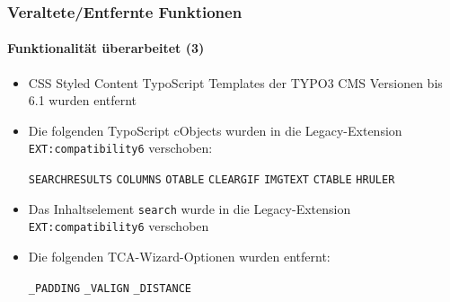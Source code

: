 \begin{frame}[fragile]
	\frametitle{Veraltete/Entfernte Funktionen}
	\framesubtitle{Funktionalität überarbeitet (3)}

	\begin{itemize}
		\item CSS Styled Content TypoScript Templates der TYPO3 CMS Versionen bis 6.1 wurden entfernt

		\item Die folgenden TypoScript cObjects wurden in die Legacy-Extension
			\texttt{EXT:compatibility6} verschoben:

			\vspace{0.2cm}

			\small
				\texttt{SEARCHRESULTS} \tabto{3cm}\texttt{COLUMNS} \tabto{6cm}\texttt{OTABLE} \tabto{9cm}\texttt{CLEARGIF}\newline
				\texttt{IMGTEXT}       \tabto{3cm}\texttt{CTABLE}  \tabto{6cm}\texttt{HRULER}
			\normalsize

		\item Das Inhaltselement \texttt{search} wurde in die Legacy-Extension \texttt{EXT:compatibility6} verschoben

		\item Die folgenden TCA-Wizard-Optionen wurden entfernt:

			\vspace{0.2cm}

			\small
				\texttt{\_PADDING} \tabto{3cm}\texttt{\_VALIGN} \tabto{6cm}\texttt{\_DISTANCE}
			\normalsize

	\end{itemize}

\end{frame}


